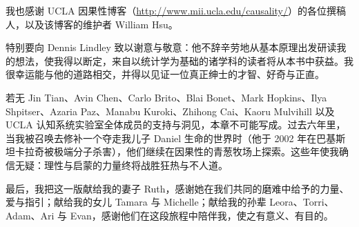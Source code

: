 我也感谢 UCLA 因果性博客（\url{http://www.mii.ucla.edu/causality/}）的各位撰稿人，以及该博客的维护者 William Hsu。

特别要向 Dennis Lindley 致以谢意与敬意：他不辞辛劳地从基本原理出发研读我的想法，使我得以断定，来自以统计学为基础的诸学科的读者将从本书中获益。我很幸运能与他的道路相交，并得以见证一位真正绅士的才智、好奇与正直。

若无 Jin Tian、Avin Chen、Carlo Brito、Blai Bonet、Mark Hopkins、Ilya Shpitser、Azaria Paz、Manabu Kuroki、Zhihong Cai、Kaoru Mulvihill 以及 UCLA 认知系统实验室全体成员的支持与洞见，本章不可能写成。过去六年里，当我被召唤去修补一个夺走我儿子 Daniel 生命的世界时（他于 2002 年在巴基斯坦卡拉奇被极端分子杀害），他们继续在因果性的青葱牧场上探索。这些年使我确信无疑：理性与启蒙的力量终将战胜狂热与不人道。

最后，我把这一版献给我的妻子 Ruth，感谢她在我们共同的磨难中给予的力量、爱与指引；献给我的女儿 Tamara 与 Michelle；献给我的孙辈 Leora、Torri、Adam、Ari 与 Evan，感谢他们在这段旅程中陪伴我，使之有意义、有目的。
